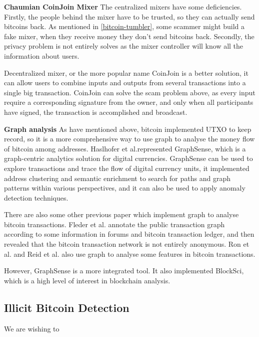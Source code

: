 \textbf{Chaumian CoinJoin Mixer}
The centralized mixers have some deficiencies. Firstly, the people behind the mixer have to be trusted, so they can actually send bitcoins back. As mentioned in \ref{bitcoin-tumbler}, some scammer might build a fake mixer, when they receive money they don't send bitcoins back. Secondly, the privacy problem is not entirely solves as the mixer controller will know all the information about users.

Decentralized mixer, or the more popular name CoinJoin is a better solution, it can allow users to combine inputs and outputs from several transactions into a single big transaction. CoinJoin can solve the scam problem above, as every input require a corresponding signature from the owner, and only when all participants have signed, the transaction is accomplished and broadcast.

\textbf{Graph analysis}
As have mentioned above, bitcoin implemented UTXO to keep record,  so it is a more comprehensive way to use graph to analyse the money flow of bitcoin among addresses. Haslhofer et al.\cite{haslhofer2016bitcoin}represented GraphSense, which is a graph-centric analytics solution for digital currencies. GraphSense can be used to explore transactions and trace the flow of digital currency units, it implemented address clustering and semantic enrichment to search for paths and graph patterns within various perspectives, and it can also be used to apply anomaly detection techniques.

There are also some other previous paper which implement graph to analyse bitcoin transactions. Fleder et al.\cite{fleder2015bitcoin} annotate the public transaction graph according to some information in forums and bitcoin transaction ledger, and then revealed that the bitcoin transaction network is not entirely anonymous.
Ron et al.\cite{ron2013quantitative} and Reid et al.\cite{reid2013analysis} also use graph to analyse some features in bitcoin transactions.

However, GraphSense is a more integrated tool. It also implemented BlockSci, which is a high level of interest in blockchain analysis.


\subsection{Illicit Bitcoin Detection}
We are wishing to 